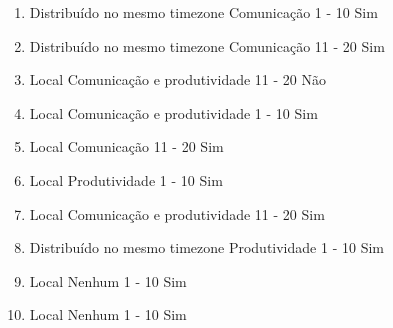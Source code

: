 \begin{enumerate}
	\item
	\begin{respostas1}
		{Distribuído no mesmo timezone}
		{Comunicação}
		{1 - 10}
		{Sim}
	\end{respostas1}

	\item
	\begin{respostas1}
		{Distribuído no mesmo timezone}
		{Comunicação}
		{11 - 20}
		{Sim}
	\end{respostas1}

	\item
	\begin{respostas1}
		{Local}
		{Comunicação e produtividade}
		{11 - 20}
		{Não}
	\end{respostas1}

	\item
	\begin{respostas1}
		{Local}
		{Comunicação e produtividade}
		{1 - 10}
		{Sim}
	\end{respostas1}

	\item
	\begin{respostas1}
		{Local}
		{Comunicação}
		{11 - 20}
		{Sim}
	\end{respostas1}

	\item
	\begin{respostas1}
		{Local}
		{Produtividade}
		{1 - 10}
		{Sim}
	\end{respostas1}

	\item
	\begin{respostas1}
		{Local}
		{Comunicação e produtividade}
		{11 - 20}
		{Sim}
	\end{respostas1}

	\item
	\begin{respostas1}
		{Distribuído no mesmo timezone}
		{Produtividade}
		{1 - 10}
		{Sim}
	\end{respostas1}

	\item
	\begin{respostas1}
		{Local}
		{Nenhum}
		{1 - 10}
		{Sim}
	\end{respostas1}

	\item
	\begin{respostas1}
		{Local}
		{Nenhum}
		{1 - 10}
		{Sim}
	\end{respostas1}
\end{enumerate}


